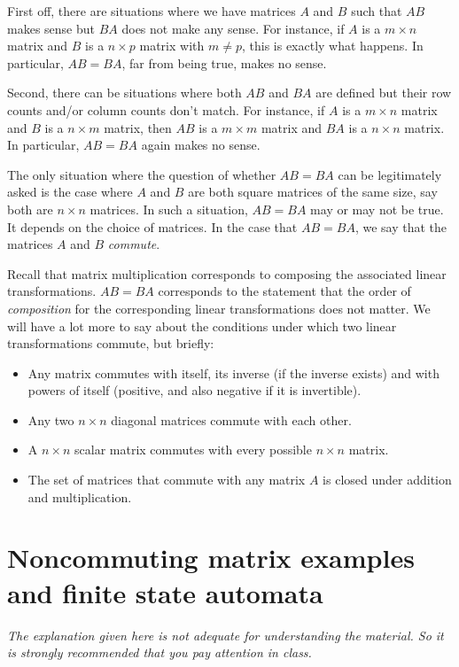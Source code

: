 \documentclass[10pt]{amsart}
\begin{document}
First off, there are situations where we have matrices $A$ and $B$
such that $AB$ makes sense but $BA$ does not make any sense. For
instance, if $A$ is a $m \times n$ matrix and $B$ is a $n \times p$
matrix with $m \ne p$, this is exactly what happens. In particular,
$AB = BA$, far from being true, makes no sense.

Second, there can be situations where both $AB$ and $BA$ are defined
but their row counts and/or column counts don't match. For instance,
if $A$ is a $m \times n$ matrix and $B$ is a $n \times m$ matrix, then
$AB$ is a $m \times m$ matrix and $BA$ is a $n \times n$ matrix. In
particular, $AB = BA$ again makes no sense.

The only situation where the question of whether $AB = BA$ can be
legitimately asked is the case where $A$ and $B$ are both square
matrices of the same size, say both are $n \times n$ matrices. In such
a situation, $AB = BA$ may or may not be true. It depends on the
choice of matrices. In the case that $AB = BA$, we say that the
matrices $A$ and $B$ {\em commute}.

Recall that matrix multiplication corresponds to composing the
associated linear transformations. $AB = BA$ corresponds to the
statement that the order of {\em composition} for the corresponding
linear transformations does not matter. We will have a lot more to say
about the conditions under which two linear transformations commute,
but briefly:

\begin{itemize}
\item Any matrix commutes with itself, its inverse (if the inverse
  exists) and with powers of itself (positive, and also negative if it
  is invertible).
\item Any two $n \times n$ diagonal matrices commute with each other.
\item A $n \times n$ scalar matrix commutes with every possible $n
  \times n$ matrix.
\item The set of matrices that commute with any matrix $A$ is closed
  under addition and multiplication.
\end{itemize}

\section{Noncommuting matrix examples and finite state automata}

{\em The explanation given here is not adequate for understanding the
  material. So it is strongly recommended that you pay attention in
  class.}
\end{document}
